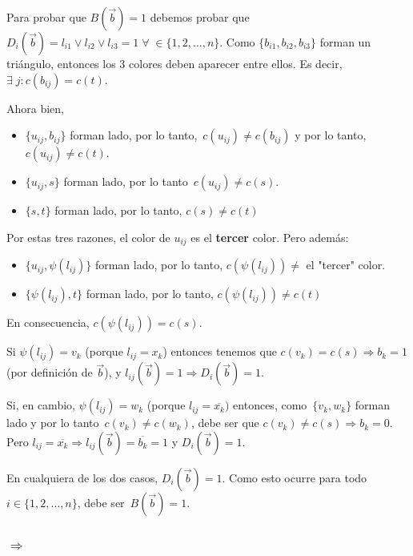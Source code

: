 \documentclass[10pt,a4paper]{article}
\begin{document}
Para probar que $B(\overrightarrow{b}) = 1$ debemos probar que $D_i(\overrightarrow{b}) = l_{i1} \lor l_{i2} \lor l_{i3} = 1 \;\forall\; \in \{1, 2, \dots, n\}$. Como $\{b_{i1}, b_{i2}, b_{i3}\}$ forman un triángulo, entonces los 3 colores deben aparecer entre ellos. Es decir, $\exists \; j : c(b_{ij}) = c(t)$.

Ahora bien,

\begin{itemize}

	\item $\{u_{ij}, b_{ij}\}$ forman lado, por lo tanto, $c(u_{ij}) \neq c(b_{ij})$ y por lo tanto, $c(u_{ij}) \neq c(t)$.
	\item $\{u_{ij}, s\}$ forman lado, por lo tanto $c(u_{ij}) \neq c(s)$.
	\item $\{s, t\}$ forman lado, por lo tanto, $c(s) \neq c(t)$
\end{itemize}

Por estas tres razones, el color de $u_{ij}$ es el \textbf{tercer} color. Pero además:

\begin{itemize}

	\item $\{u_{ij}, \psi(l_{ij})\}$ forman lado, por lo tanto, $c(\psi(l_{ij})) \neq $ el "tercer" color.
	\item $\{\psi(l_{ij}), t\}$ forman lado, por lo tanto, $c(\psi(l_{ij})) \neq c(t)$
\end{itemize}

En consecuencia, $c(\psi(l_{ij}))= c(s)$.

Si $\psi(l_{ij}) = v_k$ (porque $l_{ij} = x_k$) entonces tenemos que $c(v_k) = c(s) \Rightarrow b_k = 1$ (por definición de $\overrightarrow{b}$), y $l_{ij}(\overrightarrow{b}) = 1 \Rightarrow D_i(\overrightarrow{b}) = 1$.

Si, en cambio, $\psi(l_{ij}) = w_k$ (porque $l_{ij} = \overline{x_k})$ entonces, como $\{v_k, w_k\}$ forman lado y por lo tanto $c(v_k) \neq c(w_k)$, debe ser que $c(v_k) \neq c(s) \Rightarrow b_k = 0$. Pero $l_{ij} = \overline{x_k} \Rightarrow l_{ij}(\overrightarrow{b}) = \overline{b_k} = 1$ y $D_i(\overrightarrow{b}) = 1$.

En cualquiera de los dos casos, $D_i(\overrightarrow{b}) = 1$. Como esto ocurre para todo $i \in \{1, 2, \dots, n\}$, debe ser $B(\overrightarrow{b}) = 1$.

\subsubsection*{$\Rightarrow $}
\end{document}
